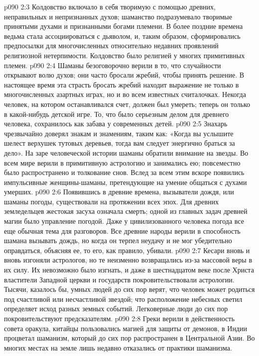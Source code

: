 \vs p090 2:3 Колдовство включало в себя  творимую с помощью древних, неправильных и непризнанных духов; шаманство подразумевало  творимые принятыми духами и признанными богами племени. В более поздние времена ведьма стала ассоциироваться с дьяволом, и, таким образом, сформировались предпосылки для многочисленных относительно недавних проявлений религиозной нетерпимости. Колдовство было религией у многих примитивных племен.
\vs p090 2:4 Шаманы безоговорочно верили в то, что случайности открывают волю духов; они часто бросали жребий, чтобы принять решение. В настоящее время эта страсть бросать жребий находит выражение не только в многочисленных азартных играх, но и во всем известных считалочках. Некогда человек, на котором останавливался счет, должен был умереть; теперь он только  в какой\hyp{}нибудь детской игре. То, что было серьезным делом для древнего человека, сохранилось как забава у современных детей.
\vs p090 2:5 Знахарь чрезвычайно доверял знакам и знамениям, таким как: «Когда вы услышите шелест верхушек тутовых деревьев, тогда вам следует энергично браться за дело». На заре человеческой истории шаманы обратили внимание на звезды. Во всем мире верили в примитивную астрологию и занимались ею; повсеместно было распространено и толкование снов. Вслед за всем этим вскоре появились импульсивные женщины\hyp{}шаманы, претендующие на умение общаться с духами умерших.
\vs p090 2:6 Появившись в древние времена, вызыватели дождя, или шаманы погоды, существовали на протяжении всех эпох. Для древних земледельцев жестокая засуха означала смерть; одной из главных задач древней магии было управление погодой. Даже у цивилизованного человека погода все еще обычная тема для разговоров. Все древние народы верили в способность шамана вызывать дождь, но когда он терпел неудачу и не мог убедительно оправдаться, объясняя ее, то его, как правило, убивали.
\vs p090 2:7 Кесари вновь и вновь изгоняли астрологов, но те неизменно возвращались из\hyp{}за массовой веры в их силу. Их невозможно было изгнать, и даже в шестнадцатом веке после Христа властители Западной церкви и государств покровительствовали астрологии. Тысячи, казалось бы, умных людей до сих пор верят, что человек может родиться под счастливой или несчастливой звездой; что расположение небесных светил определяет исход разных земных событий. Легковерные люди до сих пор покровительствуют предсказателям.
\vs p090 2:8 Греки верили в действенность совета оракула, китайцы пользовались магией для защиты от демонов, в Индии процветал шаманизм, который до сих пор распространен в Центральной Азии. Во многих местах на земле лишь недавно отказались от практики шаманизма.
